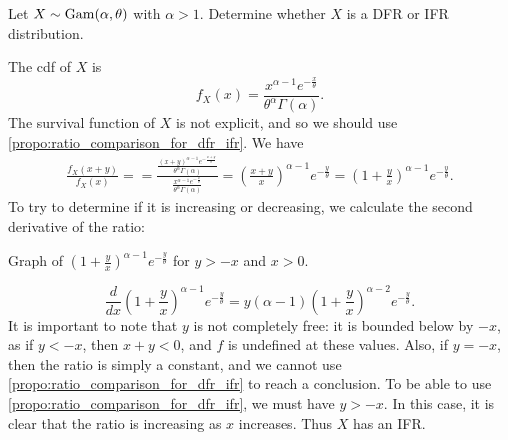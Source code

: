 \documentclass[notoc,notitlepage]{tufte-book}
\begin{document}
\begin{eg}
  Let $X \sim \operatorname{Gam}(\alpha, \theta)$ with $\alpha > 1$. Determine whether $X$ is a DFR or IFR distribution.
\end{eg}

\begin{solution}
  The cdf of $X$ is
  \begin{equation*}
    f_X(x) = \frac{x^{\alpha - 1} e^{-\frac{x}{\theta}}}{\theta^\alpha \Gamma(\alpha)}.
  \end{equation*}
  The survival function of $X$ is not explicit, and so we should use \cref{propo:ratio_comparison_for_dfr_ifr}. We have
  \begin{align*}
    \frac{f_X(x + y)}{f_X(x)} = = \frac{ \frac{(x + y)^{\alpha - 1} e^{- \frac{x + y}{\theta}}}{\theta^{\alpha} \Gamma(\alpha)} }{\frac{ x^{\alpha - 1} e^{-\frac{x}{\theta}} }{\theta^\alpha \Gamma(\alpha)}} = \left( \frac{x + y}{x} \right)^{\alpha - 1} e^{-\frac{y}{\theta}} = \left( 1 + \frac{y}{x} \right)^{\alpha - 1} e^{-\frac{y}{\theta}}.
  \end{align*}
  To try to determine if it is increasing or decreasing, we calculate the second derivative of the ratio:
  \begin{marginfigure}
    \centering
    \caption{Graph of $\left( 1 + \frac{y}{x} \right)^{\alpha - 1} e^{-\frac{y}{\theta}}$ for $y > -x$ and $x > 0$.}\label{fig:graph_of_left_1_y_x_right_alpha_1_e_y_theta_}
  \end{marginfigure}
  \begin{equation*}
    \frac{d}{dx} \left( 1 + \frac{y}{x} \right)^{\alpha - 1} e^{-\frac{y}{\theta}} = y (\alpha - 1)\left( 1 + \frac{y}{x} \right)^{\alpha - 2} e^{ -\frac{y}{\theta} }.
  \end{equation*}
  It is important to note that $y$ is not completely free: it is bounded below by $-x$, as if $y < -x$, then $x + y < 0$, and $f$ is undefined at these values. Also, if $y = -x$, then the ratio is simply a constant, and we cannot use \cref{propo:ratio_comparison_for_dfr_ifr} to reach a conclusion. To be able to use \cref{propo:ratio_comparison_for_dfr_ifr}, we must have $y > -x$. In this case, it is clear that the ratio is increasing as $x$ increases. Thus $X$ has an IFR.
\end{solution}
\end{document}
